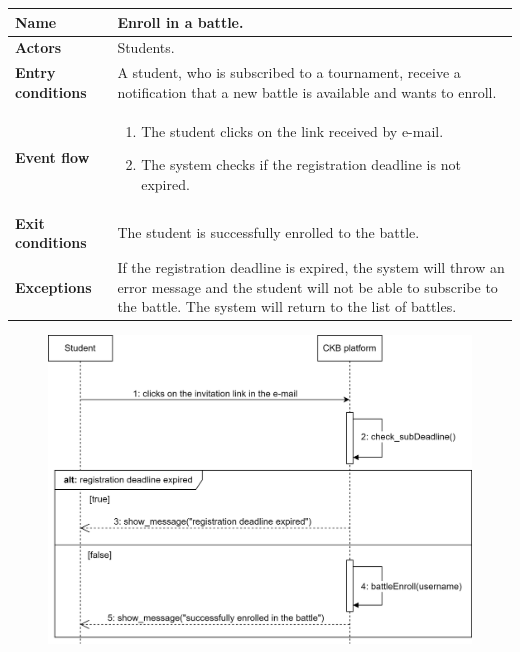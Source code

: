 \begin{enumerate}[label=\textbf{UC.\arabic*}]
\begin{table}[h]
    	    \centering
                \renewcommand{\arraystretch}{1.5}
                \begin{tabular}{|m{3.2cm}|m{9.8cm}|}
                    \hline
                    \textbf{Name} & Enroll in a battle. \\
                    \hline
                    \textbf{Actors} & Students. \\
                    \hline
                    \textbf{Entry conditions}  & A student, who is subscribed to a tournament, receive a notification that a new battle is available and wants to enroll.\\
                    \hline
                    \textbf{Event flow}  & 
                    \begin{enumerate}[label=\arabic*.]
                        \item The student clicks on the link received by e-mail.
                        \item The system checks if the registration deadline is not expired.
                    \end{enumerate}\\ 
                    \hline
                    \textbf{Exit conditions}  & The student is successfully enrolled to the battle. \\
                    \hline
                    \textbf{Exceptions}  & If the registration deadline is expired, the system will throw an error message and the student will not be able to subscribe to the battle. The system will return to the list of battles.  \\
                    \hline 
                \end{tabular}
        \end{table}
        \begin{figure}[h]
            \centering
            \includegraphics[scale = 0.7]{images/sd/enrollB.png}

\end{figure}
\end{enumerate}
